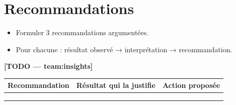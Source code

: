 \section{Recommandations}
\begin{itemize}
  \item Formuler 3 recommandations argumentées.
  \item Pour chacune : résultat observé → interprétation → recommandation.
\end{itemize}
\textbf{[TODO — team:insights]}

\begin{table}[H]
\centering
\begin{tabular}{p{4cm}p{5cm}p{5cm}}
\toprule
Recommandation & Résultat qui la justifie & Action proposée \\
\midrule
 & & \\
 & & \\
 & & \\
\bottomrule
\end{tabular}
\end{table}
